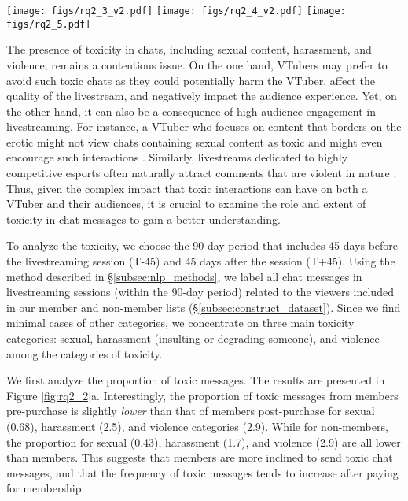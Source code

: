 \begin{figure*}
    \centering
    \texttt{[image: figs/rq2\_3\_v2.pdf]}
    \texttt{[image: figs/rq2\_4\_v2.pdf]}
    \texttt{[image: figs/rq2\_5.pdf]}
    \vspace{-2.5ex}
    \caption{(a) The proportion of toxic messages sent by members and non-members to the membership-ed VTuber; (b) The CDF of the proportion of toxic messages sent by members and non-members to the membership-ed VTuber; (c) The proportion of members who have sent a toxic chat messages to the membership-ed VTuber on the day.}
    \vspace{-2.5ex}
    \label{fig:rq2_2}
\end{figure*}

The presence of toxicity in chats, including sexual content, harassment, and violence, remains a contentious issue. 
On the one hand, VTubers may prefer to avoid such toxic chats as they could potentially harm the VTuber, affect the quality of the livestream, and negatively impact the audience experience.
Yet, on the other hand, it can also be a consequence of high audience engagement in livestreaming. For instance, a VTuber who focuses on content that borders on the erotic might not view chats containing sexual content as toxic and might even encourage such interactions \cite{10.1145/3544548.3580730, 10.1145/3543507.3583210}. Similarly, livestreams dedicated to highly competitive esports often naturally attract comments that are violent in nature \cite{Jiang_Shen_Wen_Sha_Chu_Liu_Backes_Zhang_2024}.
% 
Thus, given the complex impact that toxic interactions can have on both a VTuber and their audiences, it is crucial to examine the role and extent of toxicity in chat messages to gain a better understanding. 


To analyze the toxicity, we choose the 90-day period that includes 45 days before the livestreaming session (T-45) and 45 days after the session (T+45). 
Using the method described in \S\ref{subsec:nlp_methods}, we label all chat messages  in livestreaming sessions (within the 90-day period) related to the viewers included in our member and non-member lists (\S\ref{subsec:construct_dataset}). 
Since we find minimal cases of other categories, we concentrate on three main toxicity categories: sexual, harassment (insulting or degrading someone), and violence among the categories of toxicity.


We first analyze the proportion of toxic messages. The results are presented in Figure \ref{fig:rq2_2}a. 
Interestingly, the proportion of toxic messages from members pre-purchase is slightly \emph{lower} than that of members post-purchase for sexual (0.68\textperthousand {}\textperthousand), harassment (2.5\textperthousand {}\textperthousand), and violence categories (2.9\textperthousand {}\textperthousand). 
While for non-members, the proportion for sexual (0.43\textperthousand), harassment (1.7\textperthousand), and violence (2.9\textperthousand) are all lower than members.
This suggests that members are more inclined to send toxic chat messages, and that the frequency of toxic messages tends to increase after paying for membership.

